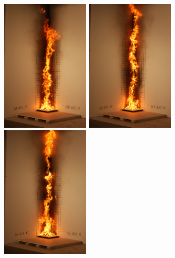 \documentclass[twoside]{uocthesis}
\begin{document}
{\begin{figure}[p]
	\includegraphics[width=1.7in]{../Figures/GBGAS10_IMG_2046}
	\includegraphics[width=1.7in]{../Figures/GBGAS10_IMG_2047}
	\includegraphics[width=1.7in]{../Figures/GBGAS10_IMG_2048} \\


\end{figure}}
\end{document}
